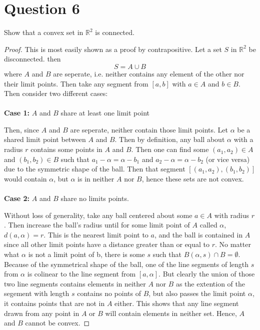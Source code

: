 \documentclass[12pt, letterpaper]{article}
\begin{document}
\section*{Question 6}
Show that a convex set in $\mathbb{R}^2$ is connected.
\begin{proof}
  This is most easily shown as a proof by contrapositive. Let a set $S$ in $\mathbb{R}^2$ be disconnected. then
  $$ S = A \cup B $$
  where $A$ and $B$ are seperate, i.e. neither contains any element of the other nor their limit points. Then take any segment from $[a, b]$ with $a \in A$ and $b \in B$.
  Then consider two different cases:\\
  \\
  \noindent\textbf{Case 1:} $A$ and $B$ share at least one limit point

  Then, since $A$ and $B$ are seperate, neither contain those limit points. Let $\alpha$ be a shared limit point between $A$ and $B$. Then by definition, any ball about $\alpha$ with a radius $r$ contains some points
  in $A$ and $B$. Then one can find some $(a_1, a_2) \in A$ and $(b_1, b_2) \in B$ such that $a_1 - \alpha = \alpha - b_1$ and $a_2 - \alpha = \alpha - b_2$  (or vice versa) due to the symmetric shape of the ball. Then that segment
  $[(a_1, a_2), (b_1, b_2)]$ would contain $\alpha$, but $\alpha$ is in neither $A$ nor $B$, hence these sets are not convex.\\
  \\
  \noindent\textbf{Case 2:} $A$ and $B$ share no limits points.

  Without loss of generality, take any ball centered about some $a \in A$ with radius $r$. Then increase the ball's radius until for some limit point of $A$ called $\alpha$, $d(a, \alpha) = r$.
  This is the nearest limit point to $a$, and the ball is contained in $A$ since all other limit points have a distance greater than or equal to $r$.
  No matter what $\alpha$ is not a limit point of b, there is some $s$ such that $B(\alpha, s) \cap B = \emptyset$. Because of the symmetrical shape of the ball,
  one of the line segments of length $s$ from $\alpha$ is colinear to the line segment from $[a, \alpha]$. But clearly the union of those two line segments contains elements in neither $A$ nor $B$ as
  the extention of the segement with length $s$ contains no points of $B$, but also passes the limit point $\alpha$, it contains points that are not in $A$ either.
  This shows that any line segment drawn from any point in $A$ or $B$ will contain elements in neither set. Hence, $A$ and $B$ cannot be convex.
\end{proof}
\end{document}
